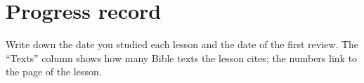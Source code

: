 \chapter{Progress record}

Write down the date you studied each lesson and the date of the first review.
The \enquote{Texts} column shows how many Bible texts the lesson cites; the
numbers link to the page of the lesson.

\progresso
